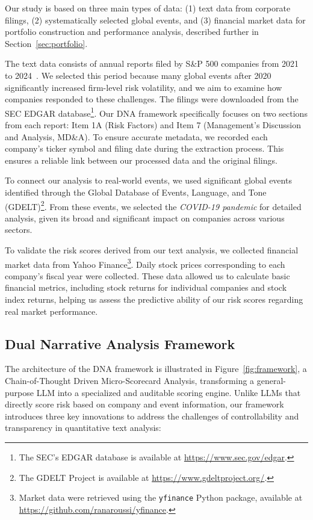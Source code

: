 \documentclass[sigconf]{acmart}
\begin{document}
Our study is based on three main types of data: (1) text data from corporate filings, (2) systematically selected global events, and (3) financial market data for portfolio construction and performance analysis, described further in Section~\ref{sec:portfolio}.

The text data consists of annual reports filed by S\&P 500 companies from 2021 to 2024~\cite{li2025flexibility}. We selected this period because many global events after 2020 significantly increased firm-level risk volatility, and we aim to examine how companies responded to these challenges. The filings were downloaded from the SEC EDGAR database\footnote{The SEC’s EDGAR database is available at \url{https://www.sec.gov/edgar}.}. Our DNA framework specifically focuses on two sections from each report: Item 1A (Risk Factors) and Item 7 (Management’s Discussion and Analysis, MD\&A). To ensure accurate metadata, we recorded each company's ticker symbol and filing date during the extraction process. This ensures a reliable link between our processed data and the original filings.

To connect our analysis to real-world events, we used significant global events identified through the Global Database of Events, Language, and Tone (GDELT)\footnote{The GDELT Project is available at \url{https://www.gdeltproject.org/}.}. From these events, we selected the \textit{COVID-19 pandemic} for detailed analysis, given its broad and significant impact on companies across various sectors.

To validate the risk scores derived from our text analysis, we collected financial market data from Yahoo Finance\footnote{Market data were retrieved using the \texttt{yfinance} Python package, available at \url{https://github.com/ranaroussi/yfinance}.}. Daily stock prices corresponding to each company’s fiscal year were collected. These data allowed us to calculate basic financial metrics, including stock returns for individual companies and stock index returns, helping us assess the predictive ability of our risk scores regarding real market performance.


\subsection{Dual Narrative Analysis Framework}

The architecture of the DNA framework is illustrated in Figure~\ref{fig:framework}, a Chain-of-Thought Driven Micro-Scorecard Analysis, transforming a general-purpose LLM into a specialized and auditable scoring engine. Unlike LLMs that directly score risk based on company and event information, our framework introduces three key innovations to address the challenges of controllability and transparency in quantitative text analysis:
\end{document}
